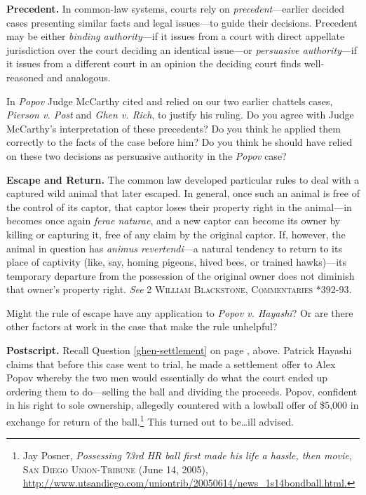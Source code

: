 \item \label{popov-precedent}\textbf{Precedent.} In common-law systems,
courts rely on \textit{precedent}---earlier decided cases presenting similar
facts and legal issues---to guide their decisions. Precedent may be either
\textit{binding authority}---if it issues from a court with direct appellate
jurisdiction over the court deciding an identical issue---or \textit{persuasive
authority}---if it issues from a different court in an opinion the deciding
court finds well-reasoned and analogous. 

In \textit{Popov} Judge McCarthy cited and relied on our two earlier chattels
cases, \textit{Pierson v. Post} and \textit{Ghen v. Rich}, to justify his
ruling. Do you agree with Judge McCarthy's interpretation of these precedents?
Do you think he applied them correctly to the facts of the case before him? Do
you think he should have relied on these two decisions as persuasive authority
in the \textit{Popov} case?


\item \textbf{Escape and Return.} The common law developed particular rules to
deal with a captured wild animal that later escaped. In general, once such an
animal is free of the control of its captor, that captor loses their property
right in the animal---in becomes once again \textit{ferae naturae}, and a new
captor can become its owner by killing or capturing it, free of any claim by the
original captor. If, however, the animal in question has \textit{animus
revertendi}---a natural tendency to return to its place of captivity (like, say,
homing pigeons, hived bees, or trained hawks)---its temporary departure from the
possession of the original owner does not diminish that owner's property right.
\textit{See} 2 \textsc{William Blackstone, Commentaries} *392-93.

Might the rule of escape have any application to \textit{Popov v. Hayashi}? Or
are there other factors at work in the case that make the rule unhelpful?


\item \textbf{Postscript.} Recall Question \ref{ghen-settlement} on page
\pageref{ghen-settlement}, above. Patrick Hayashi claims that before this case
went to trial, he made a settlement offer to Alex Popov whereby the two men
would essentially do what the court ended up ordering them to do---selling the
ball and dividing the proceeds. Popov, confident in his right to sole ownership,
allegedly countered with a lowball offer of \$5,000 in exchange for return of
the ball.\footnote{Jay Posner, \textit{Possessing 73rd HR ball first made his
life a hassle, then movie}, \textsc{San Diego Union-Tribune} (June 14, 2005),
\url{http://www.utsandiego.com/uniontrib/20050614/news\_1s14bondball.html.}}
This turned out to be\ldots ill advised.


